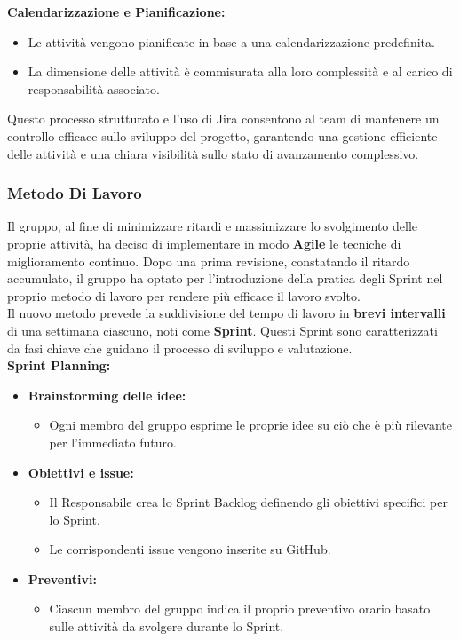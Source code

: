 \documentclass{article}
\begin{document}
\textbf{Calendarizzazione e Pianificazione:}
\begin{itemize}
    \item Le attività vengono pianificate in base a una calendarizzazione predefinita.
    \item La dimensione delle attività è commisurata alla loro complessità e al carico di responsabilità associato.
\end{itemize}
Questo processo strutturato e l'uso di Jira consentono al team di mantenere un controllo efficace sullo sviluppo del progetto, garantendo una gestione efficiente delle attività e una chiara visibilità sullo stato di avanzamento complessivo.

\subsubsection{Metodo Di Lavoro}
Il gruppo, al fine di minimizzare ritardi e massimizzare lo svolgimento delle proprie attività, ha deciso di implementare in modo \textbf{Agile} le tecniche di miglioramento continuo. Dopo una prima revisione, constatando il ritardo accumulato, il gruppo ha optato per l'introduzione della pratica degli Sprint nel proprio metodo di lavoro per rendere più efficace il lavoro svolto.\\
Il nuovo metodo prevede la suddivisione del tempo di lavoro in \textbf{brevi intervalli} di una settimana ciascuno, noti come \textbf{Sprint}. Questi Sprint sono caratterizzati da fasi chiave che guidano il processo di sviluppo e valutazione.\\
\textbf{Sprint Planning:}
\begin{itemize}
    \item \textbf{Brainstorming delle idee:}
    \begin{itemize}
        \item Ogni membro del gruppo esprime le proprie idee su ciò che è più rilevante per l'immediato futuro.
    \end{itemize}
    \item \textbf{Obiettivi e issue:}
    \begin{itemize}
        \item Il Responsabile crea lo Sprint Backlog definendo gli obiettivi specifici per lo Sprint.
        \item Le corrispondenti issue vengono inserite su GitHub.
    \end{itemize}
    \item \textbf{Preventivi:}
    \begin{itemize}
        \item Ciascun membro del gruppo indica il proprio preventivo orario basato sulle attività da svolgere durante lo Sprint.
    \end{itemize}
\end{itemize}
\end{document}
